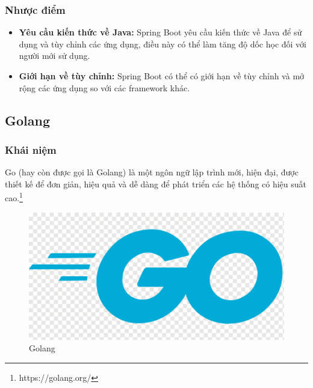 \subsubsection{Nhược điểm}
\begin{itemize}
  \item \textbf{Yêu cầu kiến thức về Java:} Spring Boot yêu cầu kiến thức về Java để sử dụng và tùy chỉnh các ứng dụng, điều này có thể làm tăng độ dốc học đối với người mới sử dụng.
  \item \textbf{Giới hạn về tùy chỉnh:} Spring Boot có thể có giới hạn về tùy chỉnh và mở rộng các ứng dụng so với các framework khác.
\end{itemize}
\subsection{Golang}
\subsubsection{Khái niệm}
\noindent Go (hay còn được gọi là Golang) là một ngôn ngữ lập trình mới, hiện đại, được thiết kế để đơn giản, hiệu quả và dễ dàng để phát triển các hệ thống có hiệu suất cao.\footnote{https://golang.org/}
\begin{figure}[H]
  \begin{center}
    \includegraphics[scale=0.25]{images/hieu/phuluc/golang.png}
    \caption{Golang}
  \end{center}
\end{figure}
